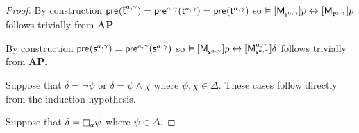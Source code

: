 \begin{proof}
By construction $\aPrecondition(\aPStateT[\agentA, \gamma]) = \aPrecondition[\agentA, \gamma](\aStateT[\agentA, \gamma]) = \aPrecondition(\aStateT[\agentA, \gamma])$ so $\entails \actionA{\aPModel{\aPStateT[\agentA, \gamma]}} \atomP \iff \actionA{\aPModel{\aStateT[\agentA, \gamma]}} \atomP$ follows trivially from {\bf AP}.

By construction $\aPrecondition(\aStateS[\agentA, \gamma]) = \aPrecondition[\agentA, \gamma](\aStateS[\agentA, \gamma])$ so $\entails \actionA{\aPModel{\aStateS[\agentA, \gamma]}} \atomP \iff \actionA{\aPModel[\agentA, \gamma]{\aStateS[\agentA, \gamma]}} \delta$ follows trivially from {\bf AP}.

Suppose that $\delta = \lnot \psi$ or $\delta = \psi \land \chi$ where $\psi, \chi \in \Delta$.
These cases follow directly from the induction hypothesis.

Suppose that $\delta = \necessaryA \psi$ where $\psi \in \Delta$.


\end{proof}
